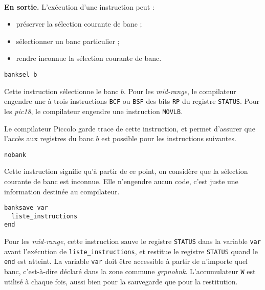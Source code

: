 ~\\
\textbf{En sortie.} L'exécution d'une instruction peut :
\begin{itemize}
  \item préserver la sélection courante de banc ;
  \item sélectionner un banc particulier ;
  \item rendre inconnue la sélection courante de banc.
\end{itemize}


\begin{lstlisting}[language=piccolo]
banksel b
\end{lstlisting}

Cette instruction sélectionne le banc $b$. Pour les \emph{mid-range}, le compilateur engendre une à trois instructions \texttt{BCF} ou \texttt{BSF} des bits \texttt{RP} du registre \texttt{STATUS}. Pour les \emph{pic18}, le compilateur engendre une instruction \texttt{MOVLB}.

Le compilateur Piccolo garde trace de cette instruction, et permet d'assurer que l'accès aux registres du banc $b$ est possible pour les instructions suivantes.

\begin{lstlisting}[language=piccolo]
nobank
\end{lstlisting}

Cette instruction signifie qu'à partir de ce point, on considère que la sélection courante de banc est inconnue. Elle n'engendre aucun code, c'est juste une information destinée au compilateur.


\begin{lstlisting}[language=piccolo]
banksave var
  liste_instructions
end
\end{lstlisting}

Pour les \emph{mid-range}, cette instruction sauve le registre \texttt{STATUS} dans la variable \texttt{var} avant l'exécution de \texttt{liste\_instructions}, et restitue le registre \texttt{STATUS} quand le \texttt{end} est atteint. La variable \texttt{var} doit être accessible à partir de n'importe quel banc, c'est-à-dire déclaré dans la zone commune \emph{grpnobnk}. L'accumulateur \texttt{W} est utilisé à chaque fois, aussi bien pour la sauvegarde que pour la restitution.

